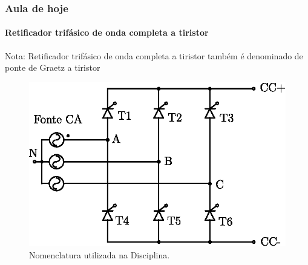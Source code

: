 \documentclass[aspectratio=43]{beamer}
\begin{document}
\begin{frame}
	\frametitle{Aula de hoje }
	\framesubtitle{Retificador trifásico de onda completa a tiristor}
	\begin{block}{Nota:}
	Retificador trifásico de onda completa a tiristor
	também é denominado de ponte de Graetz a tiristor
	\end{block}	
	\begin{figure}[!h]
		\centering
		\includegraphics[width=0.5\linewidth]{figuras/NomenclaturaUtilizadaNaDisciplina}
		\caption{Nomenclatura utilizada na Disciplina.}
	\end{figure}	
	
\end{frame}



\end{document}
